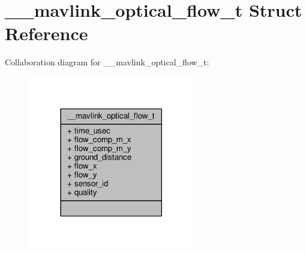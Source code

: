 \hypertarget{struct____mavlink__optical__flow__t}{\section{\+\_\+\+\_\+mavlink\+\_\+optical\+\_\+flow\+\_\+t Struct Reference}
\label{struct____mavlink__optical__flow__t}
}


Collaboration diagram for \+\_\+\+\_\+mavlink\+\_\+optical\+\_\+flow\+\_\+t\+:
\nopagebreak
\begin{figure}[H]
\begin{center}
\leavevmode
\includegraphics[width=206pt]{struct____mavlink__optical__flow__t__coll__graph}
\end{center}
\end{figure}
